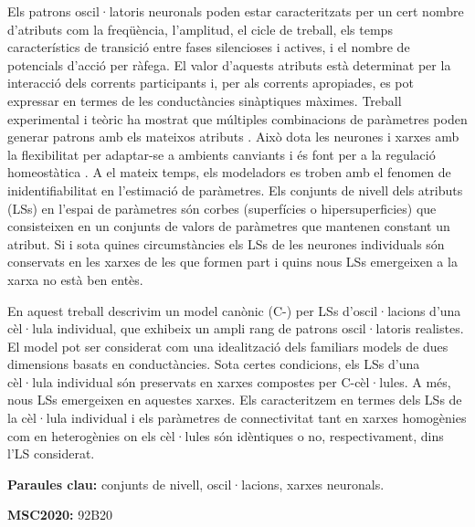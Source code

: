 Els patrons oscil·latoris neuronals poden estar caracteritzats per un cert nombre d'atributs com la freqüència, l'amplitud, el cicle de treball, els temps característics de transició entre fases silencioses i actives, i el nombre de potencials d'acció per ràfega. El valor d'aquests atributs està determinat per la interacció dels corrents participants i, per als corrents apropiades, es pot expressar en termes de les conductàncies sinàptiques màximes. Treball experimental i teòric ha mostrat que múltiples combinacions de paràmetres poden generar patrons amb els mateixos atributs \cite{Prinz,Rot,Oly,Olypher2010}. Això dota les neurones i xarxes amb la flexibilitat per adaptar-se a ambients canviants i és font per a la regulació homeostàtica \cite{Olypher2010}. A el mateix temps, els modeladors es troben amb el fenomen de inidentifiabilitat en l'estimació de paràmetres. Els conjunts de nivell dels atributs (LSs) en l'espai de paràmetres són corbes (superfícies o hipersuperficies) que consisteixen en un conjunts de valors de paràmetres que mantenen constant un atribut. Si i sota quines circumstàncies els LSs de les neurones individuals són conservats en les xarxes de les que formen part i quins nous LSs emergeixen a la xarxa no està ben entès.

En aquest treball descrivim un model canònic (C-) per LSs d'oscil·lacions d'una cèl·lula individual, que exhibeix un ampli rang de patrons oscil·latoris realistes. El model pot ser considerat com una idealització dels familiars models de dues dimensions basats en conductàncies. Sota certes condicions, els LSs d'una cèl·lula individual són preservats en xarxes compostes per C-cèl·lules. A més, nous LSs emergeixen en aquestes xarxes. Els caracteritzem en termes dels LSs de la cèl·lula individual i els paràmetres de connectivitat tant en xarxes homogènies com en heterogènies on els cèl·lules són idèntiques o no, respectivament, dins l'LS considerat.

\textbf{Paraules clau:} conjunts de nivell, oscil·lacions, xarxes neuronals.

\textbf{MSC2020:} 92B20

